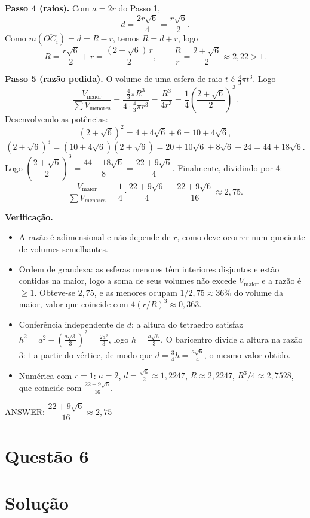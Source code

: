 \documentclass{article}%
\begin{document}
\textbf{Passo 4 (raios).} Com $a=2r$ do Passo 1,
\[
d = \frac{2r\sqrt{6}}{4} = \frac{r\sqrt{6}}{2}.
\]
Como $m(\overline{OC_i}) = d = R - r$, temos $R = d + r$, logo
\[
R = \frac{r\sqrt{6}}{2} + r = \frac{(2+\sqrt{6})\,r}{2}, \qquad \frac{R}{r}=\frac{2+\sqrt{6}}{2}\approx 2{,}22 > 1.
\]

\textbf{Passo 5 (razão pedida).} O volume de uma esfera de raio $t$ é $\frac{4}{3}\pi t^3$. Logo
\[
\frac{V_{\text{maior}}}{\sum V_{\text{menores}}}
= \frac{\frac{4}{3}\pi R^3}{4\cdot\frac{4}{3}\pi r^3}
= \frac{R^3}{4r^3}
= \frac{1}{4}\left(\frac{2+\sqrt{6}}{2}\right)^3.
\]
Desenvolvendo as potências:
\[
(2+\sqrt{6})^2 = 4+4\sqrt{6}+6 = 10+4\sqrt{6},
\]
\[
(2+\sqrt{6})^3 = (10+4\sqrt{6})(2+\sqrt{6}) = 20+10\sqrt{6}+8\sqrt{6}+24 = 44+18\sqrt{6}.
\]
Logo $\left(\dfrac{2+\sqrt{6}}{2}\right)^3=\dfrac{44+18\sqrt{6}}{8}=\dfrac{22+9\sqrt{6}}{4}$. Finalmente, dividindo por $4$:
\[
\frac{V_{\text{maior}}}{\sum V_{\text{menores}}}
= \frac{1}{4}\cdot\frac{22+9\sqrt{6}}{4}
= \frac{22+9\sqrt{6}}{16}\approx 2{,}75.
\]

\textbf{Verificação.}
\begin{itemize}
\item A razão é adimensional e não depende de $r$, como deve ocorrer num quociente de volumes semelhantes.
\item Ordem de grandeza: as esferas menores têm interiores disjuntos e estão contidas na maior, logo a soma de seus volumes não excede $V_{\text{maior}}$ e a razão é $\geq 1$. Obteve-se $2{,}75$, e as menores ocupam $1/2{,}75\approx 36\%$ do volume da maior, valor que coincide com $4(r/R)^3\approx 0{,}363$.
\item Conferência independente de $d$: a altura do tetraedro satisfaz $h^2 = a^2-\left(\frac{a\sqrt{3}}{3}\right)^2=\frac{2a^2}{3}$, logo $h=\frac{a\sqrt{6}}{3}$. O baricentro divide a altura na razão $3:1$ a partir do vértice, de modo que $d=\frac{3}{4}h=\frac{a\sqrt{6}}{4}$, o mesmo valor obtido.
\item Numérica com $r=1$: $a=2$, $d=\frac{\sqrt{6}}{2}\approx 1{,}2247$, $R\approx 2{,}2247$, $R^3/4\approx 2{,}7528$, que coincide com $\frac{22+9\sqrt{6}}{16}$.
\end{itemize}

ANSWER: $\dfrac{22+9\sqrt{6}}{16}\approx 2{,}75$%
\newpage%
\section*{Questão 6}

\section*{Solução}
\end{document}
